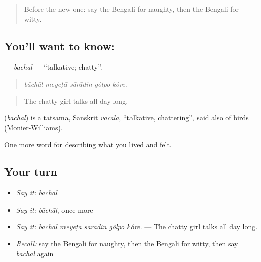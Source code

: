 \label{lesson:BN-C463-bachal}



\begin{quote}
Before the new one: say the Bengali for naughty, then the Bengali for witty.
\end{quote}

\subsection*{You'll want to know: }
\textbf{} — \emph{bāchāl} — \textquotedblleft{}talkative; chatty\textquotedblright{}.

\begin{quote}
    
\end{quote}

\begin{quote}
\emph{bāchāl meyeṭā sārādin gôlpo kôre.}
\end{quote}

\begin{quote}
The chatty girl talks all day long.
\end{quote}

\begin{cousinweb}
\textbf{} (\emph{bāchāl}) is a tatsama, Sanskrit \emph{vācāla}, \textquotedblleft{}talkative, chattering\textquotedblright{}, said also of birds (Monier-Williams).
\end{cousinweb}

\begin{grammarlens}[title={What you've built}]
One more word for describing what you lived and felt.
\end{grammarlens}

\subsection*{Your turn}
\begin{itemize}
\raggedright
  \item \emph{Say it:} \emph{bāchāl}
  \item \emph{Say it:} \emph{bāchāl}, once more
  \item \emph{Say it:} \emph{bāchāl meyeṭā sārādin gôlpo kôre.} — The chatty girl talks all day long.
  \item \emph{Recall:} say the Bengali for naughty, then the Bengali for witty, then say \emph{bāchāl} again
\end{itemize}

